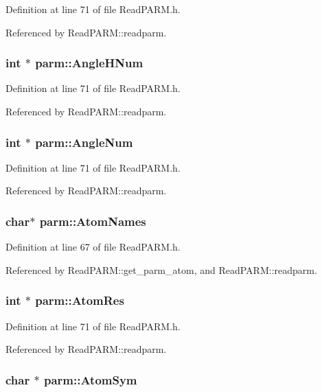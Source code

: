 Definition at line 71 of file Read\-PARM.h.

Referenced by Read\-PARM::readparm.
\subsubsection{\setlength{\rightskip}{0pt plus 5cm}int $\ast$ parm::Angle\-HNum}\label{structparm_m71}




Definition at line 71 of file Read\-PARM.h.

Referenced by Read\-PARM::readparm.
\subsubsection{\setlength{\rightskip}{0pt plus 5cm}int $\ast$ parm::Angle\-Num}\label{structparm_m75}




Definition at line 71 of file Read\-PARM.h.

Referenced by Read\-PARM::readparm.
\subsubsection{\setlength{\rightskip}{0pt plus 5cm}char$\ast$ parm::Atom\-Names}\label{structparm_m32}




Definition at line 67 of file Read\-PARM.h.

Referenced by Read\-PARM::get\_\-parm\_\-atom, and Read\-PARM::readparm.
\subsubsection{\setlength{\rightskip}{0pt plus 5cm}int $\ast$ parm::Atom\-Res}\label{structparm_m61}




Definition at line 71 of file Read\-PARM.h.

Referenced by Read\-PARM::readparm.
\subsubsection{\setlength{\rightskip}{0pt plus 5cm}char $\ast$ parm::Atom\-Sym}\label{structparm_m34}




